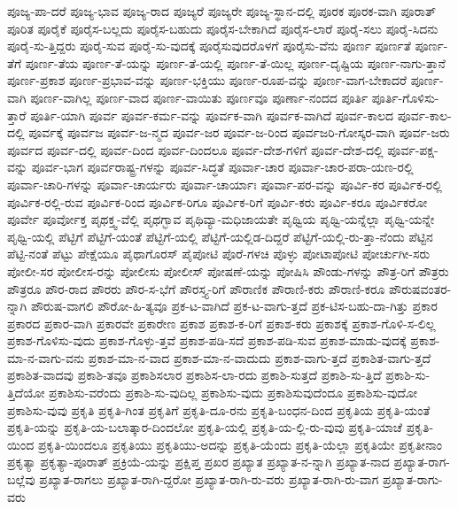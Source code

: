 {ಪೂಜ್ಯ-ಪಾ-ದರೆ
ಪೂಜ್ಯ-ಭಾವ
ಪೂಜ್ಯ-ರಾದ
ಪೂಜ್ಯರೆ
ಪೂಜ್ಯರೇ
ಪೂಜ್ಯ-ಸ್ಥಾನ-ದಲ್ಲಿ
ಪೂರಕ
ಪೂರಕ-ವಾಗಿ
ಪೂರಾತ್
ಪೂರಿತ
ಪೂರೈಕೆ
ಪೂರೈಸ-ಬಲ್ಲದು
ಪೂರೈಸ-ಬಹುದು
ಪೂರೈಸ-ಬೇಕಾಗಿದೆ
ಪೂರೈಸ-ಲಾರೆ
ಪೂರೈ-ಸಲು
ಪೂರೈ-ಸಿದನು
ಪೂರೈ-ಸು-ತ್ತಿದ್ದರು
ಪೂರೈ-ಸುವ
ಪೂರೈ-ಸು-ವುದಕ್ಕೆ
ಪೂರೈಸುವುದರೊಳಗೆ
ಪೂರೈಸು-ವೆನು
ಪೂರ್ಣ
ಪೂರ್ಣತೆ
ಪೂರ್ಣ-ತೆಗೆ
ಪೂರ್ಣ-ತೆಯ
ಪೂರ್ಣ-ತೆ-ಯನ್ನು
ಪೂರ್ಣ-ತೆ-ಯಲ್ಲಿ
ಪೂರ್ಣ-ತೆ-ಯಿಲ್ಲ
ಪೂರ್ಣ-ದೃಷ್ಟಿಯ
ಪೂರ್ಣ-ನಾಗು-ತ್ತಾನೆ
ಪೂರ್ಣ-ಪ್ರಕಾಶ
ಪೂರ್ಣ-ಪ್ರಭಾವ-ವನ್ನು
ಪೂರ್ಣ-ಭಕ್ತಿಯು
ಪೂರ್ಣ-ರೂಪ-ವನ್ನು
ಪೂರ್ಣ-ವಾಗ-ಬೇಕಾದರೆ
ಪೂರ್ಣ-ವಾಗಿ
ಪೂರ್ಣ-ವಾಗಿಲ್ಲ
ಪೂರ್ಣ-ವಾದ
ಪೂರ್ಣ-ವಾಯಿತು
ಪೂರ್ಣವೂ
ಪೂರ್ಣಾ-ನಂದದ
ಪೂರ್ತಿ
ಪೂರ್ತಿ-ಗೊಳಿಸು-ತ್ತಾರೆ
ಪೂರ್ತಿ-ಯಾಗಿ
ಪೂರ್ವ
ಪೂರ್ವ-ಕರ್ಮ-ವನ್ನು
ಪೂರ್ವಕ-ವಾಗಿ
ಪೂರ್ವಕ-ವಾಗಿದೆ
ಪೂರ್ವ-ಕಾಲದ
ಪೂರ್ವ-ಕಾಲ-ದಲ್ಲಿ
ಪೂರ್ವಕ್ಕೆ
ಪೂರ್ವಜ
ಪೂರ್ವ-ಜ-ನ್ಮದ
ಪೂರ್ವ-ಜರ
ಪೂರ್ವ-ಜ-ರಿಂದ
ಪೂರ್ವಜರಿ-ಗೋಸ್ಕರ-ವಾಗಿ
ಪೂರ್ವ-ಜರು
ಪೂರ್ವದ
ಪೂರ್ವ-ದಲ್ಲಿ
ಪೂರ್ವ-ದಿಂದ
ಪೂರ್ವ-ದಿಂದಲೂ
ಪೂರ್ವ-ದೇಶ-ಗಳಿಗೆ
ಪೂರ್ವ-ದೇಶ-ದಲ್ಲಿ
ಪೂರ್ವ-ಪಕ್ಷ-ವನ್ನು
ಪೂರ್ವ-ಭಾಗ
ಪೂರ್ವರಾಷ್ಟ್ರ-ಗಳನ್ನು
ಪೂರ್ವ-ಸಿದ್ಧತೆ
ಪೂರ್ವಾ-ಚಾರ
ಪೂರ್ವಾ-ಚಾರ-ಪರಾ-ಯಣ-ರಲ್ಲಿ
ಪೂರ್ವಾ-ಚಾರಿ-ಗಳನ್ನು
ಪೂರ್ವಾ-ಚಾರ್ಯರು
ಪೂರ್ವಾ-ಚಾರ್ಯಾಃ
ಪೂರ್ವಾ-ಪರ-ವನ್ನು
ಪೂರ್ವಿ-ಕರ
ಪೂರ್ವಿಕ-ರಲ್ಲಿ
ಪೂರ್ವಿಕ-ರಲ್ಲಿ-ರುವ
ಪೂರ್ವಿಕ-ರಿಂದ
ಪೂರ್ವಿಕ-ರಿಗೂ
ಪೂರ್ವಿಕ-ರಿಗೆ
ಪೂರ್ವಿ-ಕರು
ಪೂರ್ವಿ-ಕರೂ
ಪೂರ್ವಿಕರೋ
ಪೂರ್ವೇ
ಪೂರ್ವೋಕ್ತ
ಪೃಥಕ್ತ್ವ-ವೆಲ್ಲಿ
ಪೃಥಗ್ಭಾವ
ಪೃಥಿವ್ಯಾ-ಮಧಿಜಾಯತೇ
ಪೃಥ್ವಿಯ
ಪೃಥ್ವಿ-ಯನ್ನೆಲ್ಲಾ
ಪೃಥ್ವಿ-ಯನ್ನೇ
ಪೃಥ್ವಿ-ಯಲ್ಲಿ
ಪೆಟ್ಟಿಗೆ
ಪೆಟ್ಟಿಗೆ-ಯಂತೆ
ಪೆಟ್ಟಿಗೆ-ಯಲ್ಲಿ
ಪೆಟ್ಟಿಗೆ-ಯಲ್ಲಿಡ-ದಿದ್ದರೆ
ಪೆಟ್ಟಿಗೆ-ಯಲ್ಲಿ-ರು-ತ್ತಾ-ನೆಂದು
ಪೆಟ್ಟಿನ
ಪೆಟ್ಟಿ-ನಂತೆ
ಪೆಟ್ಟು
ಪೇಕ್ಷೆಯೂ
ಪೈಥಾಗೊರಸ್
ಪೈಪೋಟಿ
ಪೊರೆ-ಗಳಚಿ
ಪೊಳ್ಳು
ಪೋಟಾಪೋಟಿ
ಪೋರ್ಚುಗೀ-ಸರು
ಪೋಲೀ-ಸರ
ಪೋಲೀಸ-ರನ್ನು
ಪೋಲೀಸು
ಪೋಲೀಸ್
ಪೋಷಣೆ-ಯನ್ನು
ಪೋಷಿಸಿ
ಪೌಂಡು-ಗಳನ್ನು
ಪೌತ್ರ-ರಿಗೆ
ಪೌತ್ರರು
ಪೌತ್ರರೂ
ಪೌರ-ರಾದ
ಪೌರರು
ಪೌರ-ಸ-ಭೆಗೆ
ಪೌರಸ್ತ್ಯ-ರಿಗೆ
ಪೌರಾಣಿಕ
ಪೌರಾಣಿ-ಕರು
ಪೌರಾಣಿ-ಕರೂ
ಪೌರುಷವಂತರ-ನ್ನಾಗಿ
ಪೌರುಷ-ವಾಗಲಿ
ಪೌರೋ-ಹಿ-ತ್ಯವೂ
ಪ್ರಕ-ಟ-ವಾಗಿದೆ
ಪ್ರಕ-ಟ-ವಾಗು-ತ್ತದೆ
ಪ್ರಕ-ಟಿಸ-ಬಹು-ದಾ-ಗಿತ್ತು
ಪ್ರಕಾರ
ಪ್ರಕಾರದ
ಪ್ರಕಾರ-ವಾಗಿ
ಪ್ರಕಾರವೇ
ಪ್ರಕಾರೇಣ
ಪ್ರಕಾಶ
ಪ್ರಕಾಶ-ಕ-ರಿಗೆ
ಪ್ರಕಾಶ-ಕರು
ಪ್ರಕಾಶಕ್ಕೆ
ಪ್ರಕಾಶ-ಗೊಳಿ-ಸ-ಲಿಲ್ಲ
ಪ್ರಕಾಶ-ಗೊಳಿಸು-ವುದು
ಪ್ರಕಾಶ-ಗೊಳ್ಳು-ತ್ತವೆ
ಪ್ರಕಾಶ-ಪಡಿ-ಸದೆ
ಪ್ರಕಾಶ-ಪಡಿ-ಸುವ
ಪ್ರಕಾಶ-ಮಾಡು-ವುದಕ್ಕೆ
ಪ್ರಕಾಶ-ಮಾ-ನ-ವಾಗು-ವನು
ಪ್ರಕಾಶ-ಮಾ-ನ-ವಾದ
ಪ್ರಕಾಶ-ಮಾ-ನ-ವಾದುದು
ಪ್ರಕಾಶ-ವಾಗು-ತ್ತದೆ
ಪ್ರಕಾಶಿತ-ವಾಗು-ತ್ತದೆ
ಪ್ರಕಾಶಿತ-ವಾದವು
ಪ್ರಕಾಶಿ-ತವೂ
ಪ್ರಕಾಶಿಸಲಾರ
ಪ್ರಕಾಶಿಸ-ಲಾ-ರದು
ಪ್ರಕಾಶಿ-ಸುತ್ತದೆ
ಪ್ರಕಾಶಿ-ಸು-ತ್ತಿದೆ
ಪ್ರಕಾಶಿ-ಸು-ತ್ತಿದೆಯೋ
ಪ್ರಕಾಶಿಸು-ವರೆಂದು
ಪ್ರಕಾಶಿ-ಸು-ವುದಿಲ್ಲ
ಪ್ರಕಾಶಿಸು-ವುದು
ಪ್ರಕಾಶಿಸುವುದೆಂದೂ
ಪ್ರಕಾಶಿಸು-ವುದೋ
ಪ್ರಕಾಶಿಸು-ವುವು
ಪ್ರಕೃತಿ
ಪ್ರಕೃತಿ-ಗಿಂತ
ಪ್ರಕೃತಿಗೆ
ಪ್ರಕೃತಿ-ದೂ-ರನು
ಪ್ರಕೃತಿ-ಬಂಧನ-ದಿಂದ
ಪ್ರಕೃತಿಯ
ಪ್ರಕೃತಿ-ಯಂತೆ
ಪ್ರಕೃತಿ-ಯನ್ನು
ಪ್ರಕೃತಿ-ಯ-ಬಲಾತ್ಕಾರ-ದಿಂದಲೋ
ಪ್ರಕೃತಿ-ಯಲ್ಲಿ
ಪ್ರಕೃತಿ-ಯ-ಲ್ಲಿ-ರು-ವುವು
ಪ್ರಕೃತಿ-ಯಾಚೆ
ಪ್ರಕೃತಿ-ಯಿಂದ
ಪ್ರಕೃತಿ-ಯಿಂದಲೂ
ಪ್ರಕೃತಿಯು
ಪ್ರಕೃತಿಯು-ಅದನ್ನು
ಪ್ರಕೃತಿ-ಯೆಂದು
ಪ್ರಕೃತಿ-ಯೆಲ್ಲಾ
ಪ್ರಕೃತಿಯೇ
ಪ್ರಕೃತೀನಾಂ
ಪ್ರಕೃತ್ಯಾ
ಪ್ರಕೃತ್ಯಾ-ಪೂರಾತ್
ಪ್ರಕ್ರಿಯೆ-ಯನ್ನು
ಪ್ರಕ್ಷಿಪ್ತ
ಪ್ರಖರ
ಪ್ರಖ್ಯಾತ
ಪ್ರಖ್ಯಾತ-ನ-ನ್ನಾಗಿ
ಪ್ರಖ್ಯಾತ-ನಾದ
ಪ್ರಖ್ಯಾತ-ರಾಗ-ಬಲ್ಲೆವು
ಪ್ರಖ್ಯಾತ-ರಾಗಲು
ಪ್ರಖ್ಯಾತ-ರಾಗಿ-ದ್ದರೋ
ಪ್ರಖ್ಯಾತ-ರಾಗಿ-ರು-ವರು
ಪ್ರಖ್ಯಾತ-ರಾಗಿ-ರು-ವಾಗ
ಪ್ರಖ್ಯಾತ-ರಾಗು-ವರು
}
